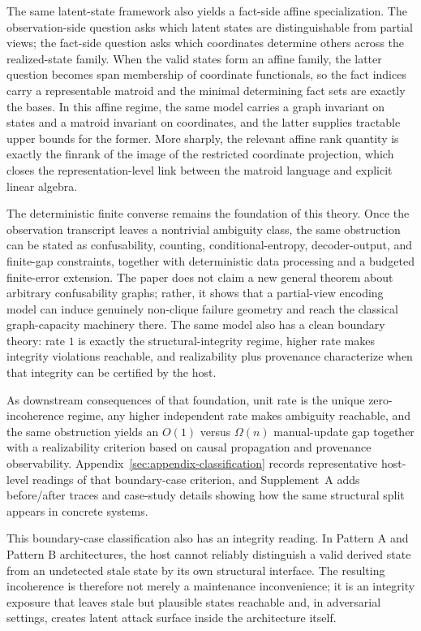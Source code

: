The same latent-state framework also yields a fact-side affine specialization. The observation-side question asks which latent states are distinguishable from partial views; the fact-side question asks which coordinates determine others across the realized-state family. When the valid states form an affine family, the latter question becomes span membership of coordinate functionals, so the fact indices carry a representable matroid and the minimal determining fact sets are exactly the bases. In this affine regime, the same model carries a graph invariant on states and a matroid invariant on coordinates, and the latter supplies tractable upper bounds for the former. More sharply, the relevant affine rank quantity is exactly the finrank of the image of the restricted coordinate projection, which closes the representation-level link between the matroid language and explicit linear algebra.

The deterministic finite converse remains the foundation of this theory. Once the observation transcript leaves a nontrivial ambiguity class, the same obstruction can be stated as confusability, counting, conditional-entropy, decoder-output, and finite-gap constraints, together with deterministic data processing and a budgeted finite-error extension. The paper does not claim a new general theorem about arbitrary confusability graphs; rather, it shows that a partial-view encoding model can induce genuinely non-clique failure geometry and reach the classical graph-capacity machinery there. The same model also has a clean boundary theory: rate $1$ is exactly the structural-integrity regime, higher rate makes integrity violations reachable, and realizability plus provenance characterize when that integrity can be certified by the host.

As downstream consequences of that foundation, unit rate is the unique zero-incoherence regime, any higher independent rate makes ambiguity reachable, and the same obstruction yields an $O(1)$ versus $\Omega(n)$ manual-update gap together with a realizability criterion based on causal propagation and provenance observability. Appendix~\ref{sec:appendix-classification} records representative host-level readings of that boundary-case criterion, and Supplement~A adds before/after traces and case-study details showing how the same structural split appears in concrete systems.

This boundary-case classification also has an integrity reading. In Pattern A and Pattern B architectures, the host cannot reliably distinguish a valid derived state from an undetected stale state by its own structural interface. The resulting incoherence is therefore not merely a maintenance inconvenience; it is an integrity exposure that leaves stale but plausible states reachable and, in adversarial settings, creates latent attack surface inside the architecture itself.

